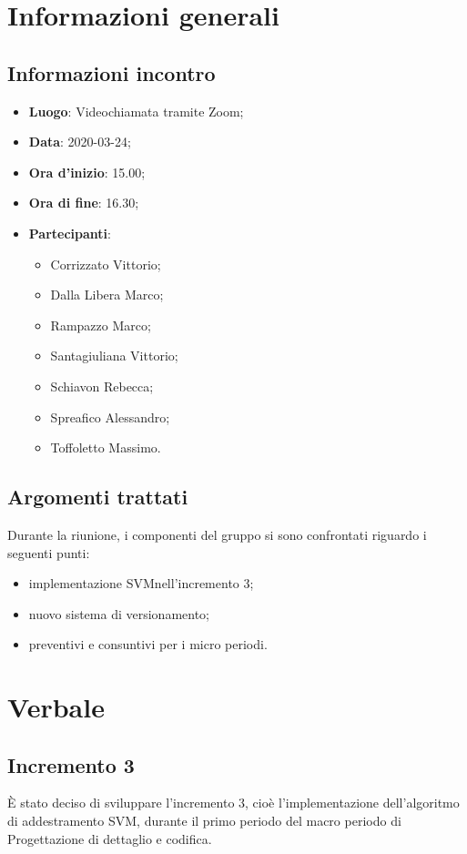 \section{Informazioni generali}
    \subsection{Informazioni incontro}
        \begin{itemize}
            \item \textbf{Luogo}: Videochiamata tramite Zoom;
            \item \textbf{Data}: 2020-03-24;
            \item \textbf{Ora d'inizio}: 15.00;
            \item \textbf{Ora di fine}: 16.30;
            \item \textbf{Partecipanti}: \begin{itemize}
                \item Corrizzato Vittorio;
                \item Dalla Libera Marco;
                \item Rampazzo Marco;
                \item Santagiuliana Vittorio;
                \item Schiavon Rebecca;
                \item Spreafico Alessandro;
                \item Toffoletto Massimo.
            \end{itemize}
        \end{itemize}
    \subsection{Argomenti trattati}
        Durante la riunione, i componenti del gruppo si sono confrontati riguardo i seguenti punti:
		\begin{itemize}
			\item implementazione SVM\glosp nell'incremento 3;
			\item nuovo sistema di versionamento\glo;
			\item preventivi e consuntivi per i micro periodi.
		\end{itemize}
\section{Verbale}
    \subsection{Incremento 3}
    È stato deciso di sviluppare l'incremento 3, cioè l'implementazione dell'algoritmo di addestramento SVM\glo, durante il primo periodo del macro periodo di Progettazione di dettaglio e codifica.
    
